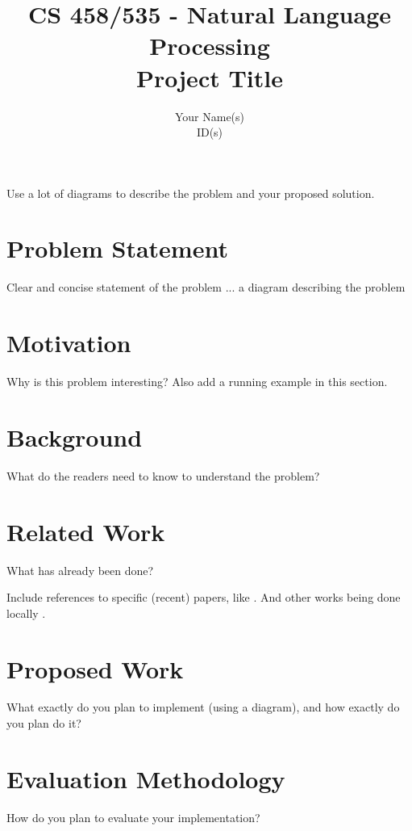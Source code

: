 \documentclass[10pt]{article}
\theoremstyle{plain}
\theoremstyle{definition}
\theoremstyle{remark}
\begin{document}
\title{CS 458/535 - Natural Language Processing\\Project Title}
\author{Your Name(s) \\ ID(s)}
\date{}
\maketitle

Use a lot of diagrams to describe the problem and your proposed solution.

\section{Problem Statement}
Clear and concise statement of the problem ... a diagram describing the problem

\section{Motivation}

Why is this problem interesting? Also add a running example in this section.

\section{Background}

What do the readers need to know to understand the problem?

\section{Related Work}
What has already been done?

\noindent Include references to specific (recent) papers, like \cite{awan2021top}.
And other works being done locally \cite{naeem2020subspace}.

\section{Proposed Work}

What exactly do you plan to implement (using a diagram), and how exactly do you plan do it?  

\section{Evaluation Methodology}

How do you plan to evaluate your implementation?
\end{document}
